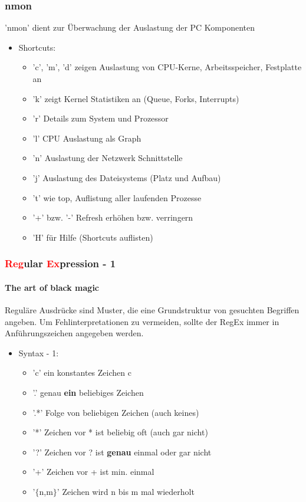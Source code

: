 \documentclass[12pt,utf8, handout]{beamer}
\begin{document}
\begin{frame}
\frametitle{nmon}
'nmon' dient zur Überwachung der Auslastung der PC Komponenten
\begin{itemize}
	\item Shortcuts:
	\begin{itemize}[<+->]
		\item {\scriptsize 'c', 'm', 'd' zeigen Auslastung von CPU-Kerne, Arbeitsspeicher, Festplatte an}
		\item {\scriptsize 'k' zeigt Kernel Statistiken an (Queue, Forks, Interrupts)}
		\item {\scriptsize 'r' Details zum System und Prozessor}
		\item {\scriptsize 'l' CPU Auslastung als Graph}
		\item {\scriptsize 'n' Auslastung der Netzwerk Schnittstelle}
		\item {\scriptsize 'j' Auslastung des Dateisystems (Platz und Aufbau)}
		\item {\scriptsize 't' wie top, Auflistung aller laufenden Prozesse}
		\item {\scriptsize '+' bzw. '-' Refresh erhöhen bzw. verringern}
		\item {\scriptsize 'H' für Hilfe (Shortcuts auflisten)}
	\end{itemize}
\end{itemize}
\end{frame}

\begin{frame}
\frametitle{\textcolor{red}{Reg}ular \textcolor{red}{Ex}pression - 1}
\framesubtitle{\textcolor{ownDarkOr}{The art of black magic}}
Reguläre Ausdrücke sind Muster, die eine Grundstruktur von gesuchten Begriffen angeben. Um Fehlinterpretationen zu vermeiden, sollte der RegEx immer in Anführungszeichen angegeben werden.
\begin{itemize}
	\item Syntax - 1:
	\begin{itemize}[<+->]
		\item {\scriptsize 'c' ein konstantes Zeichen c}
		\item {\scriptsize '.' genau \textbf{ein} beliebiges Zeichen}
		\item {\scriptsize '.*' Folge von beliebigen Zeichen (auch keines)}
		\item {\scriptsize '*' Zeichen vor * ist beliebig oft (auch gar nicht)}
		\item {\scriptsize '?' Zeichen vor ? ist \textbf{genau} einmal oder gar nicht}
		\item {\scriptsize '+' Zeichen vor + ist min. einmal}
		\item {\scriptsize '$\{$n,m$\}$' Zeichen wird n bis m mal wiederholt}
	\end{itemize}
\end{itemize}
\end{frame}
\end{document}
